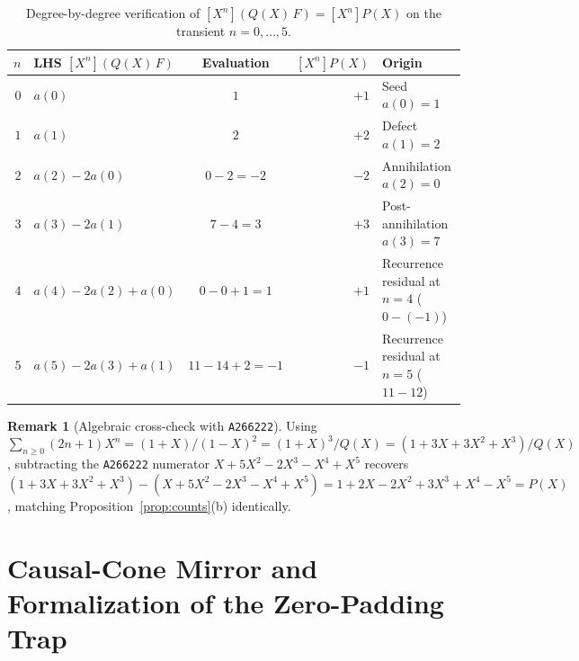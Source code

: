 \documentclass[11pt]{article}
\theoremstyle{definition}
\newtheorem{remark}[theorem]{Remark}
\newcommand{\seq}[1]{\texttt{#1}}
\begin{document}
\begin{table}[ht]
\centering
\caption{Degree-by-degree verification of $[X^n](Q(X)\,F) = [X^n]P(X)$ on the transient $n = 0, \dots, 5$.}
\label{tab:gf-transient}
\smallskip
{\small
\begin{tabular}{@{}r l c r l@{}}
\toprule
$n$ & LHS $[X^n](Q(X)\,F)$ & Evaluation & $[X^n]P(X)$ & Origin \\
\midrule
$0$ & $a(0)$ & $1$ & $+1$ & Seed $a(0) = 1$ \\
$1$ & $a(1)$ & $2$ & $+2$ & Defect $a(1) = 2$ \\
$2$ & $a(2) - 2a(0)$ & $0 - 2 = -2$ & $-2$ & Annihilation $a(2) = 0$ \\
$3$ & $a(3) - 2a(1)$ & $7 - 4 = 3$ & $+3$ & Post-annihilation $a(3) = 7$ \\
$4$ & $a(4) - 2a(2) + a(0)$ & $0 - 0 + 1 = 1$ & $+1$ & Recurrence residual at $n = 4$ ($0 - (-1)$) \\
$5$ & $a(5) - 2a(3) + a(1)$ & $11 - 14 + 2 = -1$ & $-1$ & Recurrence residual at $n = 5$ ($11 - 12$) \\
\bottomrule
\end{tabular}
}
\end{table}

\begin{remark}[Algebraic cross-check with \seq{A266222}]
Using $\sum_{n \ge 0} (2n + 1) X^n = (1 + X)/(1 - X)^2 = (1 + X)^3/Q(X) = (1 + 3X + 3X^2 + X^3)/Q(X)$, subtracting the \seq{A266222} numerator $X + 5X^2 - 2X^3 - X^4 + X^5$ recovers $(1 + 3X + 3X^2 + X^3) - (X + 5X^2 - 2X^3 - X^4 + X^5) = 1 + 2X - 2X^2 + 3X^3 + X^4 - X^5 = P(X)$, matching Proposition~\ref{prop:counts}(b) identically.
\end{remark}

\section{Causal-Cone Mirror and Formalization of the Zero-Padding Trap}
\label{sec:trap}
\end{document}
